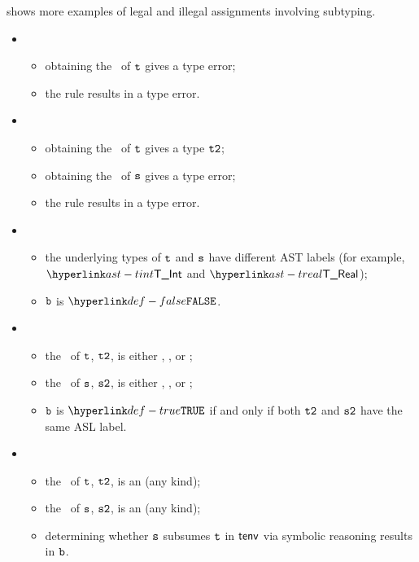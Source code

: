  shows more examples of legal and illegal assignments involving
subtyping.

\ProseParagraph
\OneApplies
\begin{itemize}
\item {}
  \begin{itemize}
  \item obtaining the \underlyingtype\ of $\texttt{t}$ gives a type error;
  \item the rule results in a type error.
  \end{itemize}

\item {}
  \begin{itemize}
    \item obtaining the \underlyingtype\ of $\texttt{t}$ gives a type $\texttt{t2}$;
    \item obtaining the \underlyingtype\ of $\texttt{s}$ gives a type error;
    \item the rule results in a type error.
    \end{itemize}

\item {}
  \begin{itemize}
  \item the underlying types of $\texttt{t}$ and $\texttt{s}$ have different AST labels
  (for example, $\TInt$ and $\TReal$);
  \item $\texttt{b}$ is $\False$.
  \end{itemize}

\item {}
  \begin{itemize}
  \item the \underlyingtype\ of $\texttt{t}$, $\texttt{t2}$, is either \realtypeterm{}, \stringtypeterm{}, or \booleantypeterm{};
  \item the \underlyingtype\ of $\texttt{s}$, $\texttt{s2}$, is either \realtypeterm{}, \stringtypeterm{}, or \booleantypeterm{};
  \item $\texttt{b}$ is $\True$ if and only if both $\texttt{t2}$ and $\texttt{s2}$ have the same ASL label.
  \end{itemize}

\item {}
  \begin{itemize}
  \item the \underlyingtype\ of $\texttt{t}$, $\texttt{t2}$, is an \integertypeterm{} (any kind);
  \item the \underlyingtype\ of $\texttt{s}$, $\texttt{s2}$, is an \integertypeterm{} (any kind);
  \item determining whether $\texttt{s}$ subsumes $\texttt{t}$ in $\textsf{tenv}$ via symbolic reasoning results in $\texttt{b}$.
  \end{itemize}


\end{itemize}
